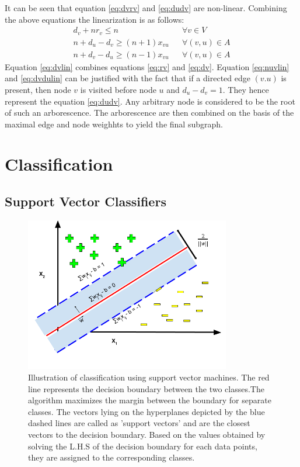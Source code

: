 \documentclass[msthesis.tex]{subfiles}
\begin{document}
It can be seen that equation \ref{eq:dvrv} and \ref{eq:dudv} are non-linear. Combining the above equations the linearization is as follows:
\begin{align}
    \label{eq:dvlin}
    d_v + n r_v \leq n && \forall v \in V\\
    \label{eq:nuvlin}
    n + d_u - d_v \geq (n+1) x_{vu} && \forall (v,u) \in A\\
    \label{eq:dvdulin}
    n + d_v - d_u \geq (n-1) x_{vu} && \forall (v,u) \in A
\end{align}
Equation \ref{eq:dvlin} combines equations \ref{eq:rv} and \ref{eq:dv}. Equation \ref{eq:nuvlin} and \ref{eq:dvdulin} can be justified with the fact that if a directed edge $(v.u)$ is present, then node $v$ is visited before node $u$ and $d_u - d_v = 1$. They hence represent the equation \ref{eq:dudv}.
Any arbitrary node is considered to be the root of such an arborescence. The arborescence are then combined on the basis of the maximal edge and node weighhts to yield the final subgraph. 

\section{Classification}
\subsection{Support Vector Classifiers}
\begin{figure}
    \label{fig:svm}
    \centering
    \includegraphics[width=0.8\textwidth]{images/SVM.png}
    \caption{Illustration of classification using support vector machines. The red line represents the decision boundary between the two classes.The algorithm maximizes the margin between the boundary for separate classes. The vectors lying on the hyperplanes depicted by the blue dashed lines are called as 'support vectors' and are the closest vectors to the decision boundary. Based on the values obtained by solving the L.H.S of the decision boundary for each data points, they are assigned to the corresponding classes.}
    \label{fig:my_label}
\end{figure}
\end{document}

